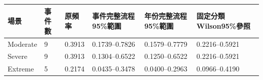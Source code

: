 \begin{tabular}{llllll}
\hline
場景 & 事件數 & 原頻率 & 事件完整流程95\%範圍 & 年份完整流程95\%範圍 & 固定分類Wilson95\%參照 \\
\hline
Moderate & 9 & 0.3913 & 0.1739–0.7826 & 0.1579–0.7779 & 0.2216–0.5921 \\
Severe & 9 & 0.3913 & 0.1304–0.6522 & 0.1250–0.6522 & 0.2216–0.5921 \\
Extreme & 5 & 0.2174 & 0.0435–0.3478 & 0.0400–0.2963 & 0.0966–0.4190 \\
\hline
\end{tabular}